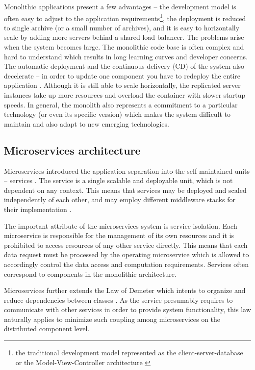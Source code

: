 \documentclass[oneside,
  digital, %
  table,   %
  lof,     %
  lot,     %
]{fithesis3}
\begin{document}
Monolithic applications present a few advantages -- the development model is often easy to adjust to the application requirements\footnote{the traditional development model represented as the client-server-database or the Model-View-Controller architecture \cite{mvn_architecture}}, the deployment is reduced to single archive (or a small number of archives), and it is easy to horizontally scale by adding more servers behind a shared load balancer. The problems arise when the system becomes large. The monolithic code base is often complex and hard to understand which results in long learning curves \cite{learning_curve} and developer concerns. The automatic deployment and the continuous delivery (CD) of the system also decelerate -- in order to update one component you have to redeploy the entire application \cite{monolithic_arch}. Although it is still able to scale horizontally, the replicated server instances take up more resources and overload the container with slower startup speeds. In general, the monolith also represents a commitment to a particular technology (or even its specific version) which makes the system difficult to maintain and also adapt to new emerging technologies.


\subsection{Microservices architecture}

Microservices introduced the application separation into the self-maintained units – services \cite{intro_to_microservices}. The service is a single scalable and deployable unit, which is not dependent on any context. This means that services may be deployed and scaled independently of each other, and may employ different middleware stacks for their implementation \cite{ms_arch_ecommerce}. 

The important attribute of the microservices system is service isolation. Each microservice is responsible for the management of its own resources and it is prohibited to access resources of any other service directly. This means that each data request must be processed by the operating microservice which is allowed to accordingly control the data access and computation requirements. Services often correspond to components in the monolithic architecture.

Microservices further extends the Law of Demeter which intents to organize and reduce dependencies between classes \cite{law_of_demeter}. As the service presumably requires to communicate with other services in order to provide system functionality, this law naturally applies to minimize such coupling among microservices on the distributed component level. 
\end{document}

